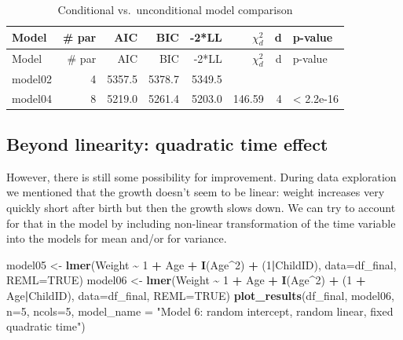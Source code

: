 \documentclass[
  12pt,
]{article}
\newenvironment{Shaded}{\begin{snugshade}}{\end{snugshade}}
\newcommand{\AttributeTok}[1]{\textcolor[rgb]{0.13,0.29,0.53}{#1}}
\newcommand{\ConstantTok}[1]{\textcolor[rgb]{0.56,0.35,0.01}{#1}}
\newcommand{\DecValTok}[1]{\textcolor[rgb]{0.00,0.00,0.81}{#1}}
\newcommand{\FunctionTok}[1]{\textcolor[rgb]{0.13,0.29,0.53}{\textbf{#1}}}
\newcommand{\NormalTok}[1]{#1}
\newcommand{\OtherTok}[1]{\textcolor[rgb]{0.56,0.35,0.01}{#1}}
\newcommand{\SpecialCharTok}[1]{\textcolor[rgb]{0.81,0.36,0.00}{\textbf{#1}}}
\newcommand{\StringTok}[1]{\textcolor[rgb]{0.31,0.60,0.02}{#1}}
\begin{document}
\begin{longtable}[]{@{}lrrrrrrl@{}}
\caption{Conditional vs.~unconditional model comparison}\tabularnewline
\toprule\noalign{}
Model & \# par & AIC & BIC & -2*LL & \(\chi^2_d\) & d & p-value \\
\midrule\noalign{}
\endfirsthead
\toprule\noalign{}
Model & \# par & AIC & BIC & -2*LL & \(\chi^2_d\) & d & p-value \\
\midrule\noalign{}
\endhead
\bottomrule\noalign{}
\endlastfoot
model02 & 4 & 5357.5 & 5378.7 & 5349.5 & & & \\
model04 & 8 & 5219.0 & 5261.4 & 5203.0 & 146.59 & 4 & \textless{}
2.2e-16 \\
\end{longtable}

\subsection{Beyond linearity: quadratic time
effect}\label{beyond-linearity-quadratic-time-effect}

However, there is still some possibility for improvement. During data
exploration we mentioned that the growth doesn't seem to be linear:
weight increases very quickly short after birth but then the growth
slows down. We can try to account for that in the model by including
non-linear transformation of the time variable into the models for mean
and/or for variance.

\begin{Shaded}
\begin{Highlighting}[]
\NormalTok{model05 }\OtherTok{\textless{}{-}} \FunctionTok{lmer}\NormalTok{(Weight }\SpecialCharTok{\textasciitilde{}} \DecValTok{1} \SpecialCharTok{+}\NormalTok{ Age }\SpecialCharTok{+} \FunctionTok{I}\NormalTok{(Age}\SpecialCharTok{\^{}}\DecValTok{2}\NormalTok{) }\SpecialCharTok{+}\NormalTok{ (}\DecValTok{1}\SpecialCharTok{|}\NormalTok{ChildID), }
                \AttributeTok{data=}\NormalTok{df\_final, }\AttributeTok{REML=}\ConstantTok{TRUE}\NormalTok{)}
\NormalTok{model06 }\OtherTok{\textless{}{-}} \FunctionTok{lmer}\NormalTok{(Weight }\SpecialCharTok{\textasciitilde{}} \DecValTok{1} \SpecialCharTok{+}\NormalTok{ Age }\SpecialCharTok{+} \FunctionTok{I}\NormalTok{(Age}\SpecialCharTok{\^{}}\DecValTok{2}\NormalTok{) }\SpecialCharTok{+}\NormalTok{ (}\DecValTok{1} \SpecialCharTok{+}\NormalTok{ Age}\SpecialCharTok{|}\NormalTok{ChildID), }
                    \AttributeTok{data=}\NormalTok{df\_final, }\AttributeTok{REML=}\ConstantTok{TRUE}\NormalTok{)}
\FunctionTok{plot\_results}\NormalTok{(df\_final, model06, }\AttributeTok{n=}\DecValTok{5}\NormalTok{, }\AttributeTok{ncols=}\DecValTok{5}\NormalTok{,}
             \AttributeTok{model\_name =} \StringTok{"Model 6: random intercept, random linear, fixed quadratic time"}\NormalTok{)}
\end{Highlighting}
\end{Shaded}
\end{document}
